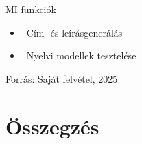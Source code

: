 \documentclass[aspectratio=169, 11pt]{beamer}
\begin{document}
\begin{frame}{MI funkciók}
    \begin{center}
    \end{center}
    \begin{itemize}
      \item \faPen~Cím- és leírásgenerálás
      \item \faFlask~Nyelvi modellek tesztelése
    \end{itemize}
    \begin{center}
        \scriptsize Forrás: Saját felvétel, 2025
    \end{center}
\end{frame}

\section{Összegzés}
\end{document}
